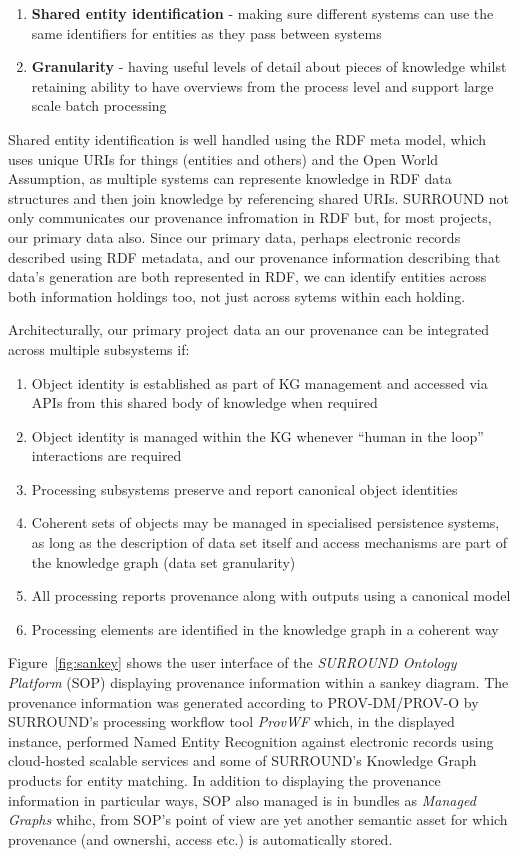 \documentclass[letterpaper,twocolumn,10pt]{article}
\begin{document}
\begin{enumerate}
  \item \textbf{Shared entity identification} - making sure different systems can use the same identifiers for entities as they pass between systems
  \item \textbf{Granularity} - having useful levels of detail about pieces of knowledge whilst retaining ability to have overviews from the process level and support large scale batch processing
\end{enumerate}

Shared entity identification is well handled using the RDF meta model, which uses unique URIs for things (entities and others) and 
the Open World Assumption, as multiple systems can represente knowledge in RDF data structures and then join knowledge by referencing 
shared URIs. SURROUND not only communicates our provenance infromation in RDF but, for most projects, our primary data also. Since 
our primary data, perhaps electronic records described using RDF metadata, and our provenance information describing that data's 
generation are both represented in RDF, we can identify entities across both information holdings too, not just across sytems within 
each holding.

Architecturally, our primary project data an our provenance can be integrated across multiple subsystems if:

\begin{enumerate}
  \item Object identity is established as part of KG management and accessed via APIs from this shared body of knowledge when required
  \item Object identity is managed within the KG whenever ``human in the loop'' interactions are required
  \item Processing subsystems preserve and report canonical object identities
  \item Coherent sets of objects may be managed in specialised persistence systems, as long as the description of data set itself and access mechanisms are part of the knowledge graph (data set granularity)
  \item All processing reports provenance along with outputs using a canonical model
  \item Processing elements are identified in the knowledge graph in a coherent way
\end{enumerate}

Figure~\ref{fig:sankey} shows the user interface of the \textit{SURROUND Ontology Platform} (SOP) displaying provenance information within 
a sankey diagram. The provenance information was generated according to PROV-DM/PROV-O by SURROUND's processing workflow tool \textit{ProvWF} 
which, in the displayed instance, performed Named Entity Recognition against electronic records using cloud-hosted scalable services and some 
of SURROUND's Knowledge Graph products for entity matching. In addition to displaying the provenance information in particular ways, SOP also 
managed is in bundles as \textit{Managed Graphs} whihc, from SOP's point of view are yet another semantic asset for which provenance (and 
ownershi, access etc.) is automatically stored.
\end{document}
